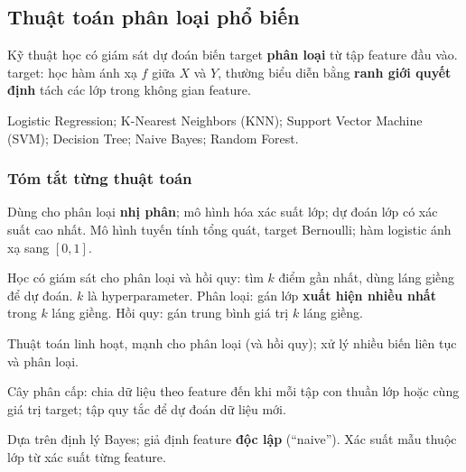 \subsection{Thuật toán phân loại phổ biến}

\begin{dinhnghia}[title={Thuật toán phân loại}]
Kỹ thuật học có giám sát dự đoán biến target \textbf{phân loại} từ tập feature đầu vào.
target: học hàm ánh xạ $f$ giữa $X$ và $Y$, thường biểu diễn bằng \textbf{ranh giới quyết định} tách các lớp trong không gian feature.
\end{dinhnghia}

\begin{phuongphap}[title={Danh sách (chi tiết ở các chương sau)}]
Logistic Regression; K-Nearest Neighbors (KNN); Support Vector Machine (SVM); Decision Tree; Naive Bayes; Random Forest.
\end{phuongphap}

\subsubsection{Tóm tắt từng thuật toán}

\begin{ynghia}[title={Logistic Regression}]
Dùng cho phân loại \textbf{nhị phân}; mô hình hóa xác suất lớp; dự đoán lớp có xác suất cao nhất.
Mô hình tuyến tính tổng quát, target Bernoulli; hàm logistic ánh xạ sang $[0,1]$.
\end{ynghia}

\begin{ynghia}[title={K-Nearest Neighbors (KNN)}]
Học có giám sát cho phân loại và hồi quy: tìm $k$ điểm gần nhất, dùng láng giềng để dự đoán.
$k$ là hyperparameter.
Phân loại: gán lớp \textbf{xuất hiện nhiều nhất} trong $k$ láng giềng.
Hồi quy: gán trung bình giá trị $k$ láng giềng.
\end{ynghia}

\begin{ynghia}[title={Support Vector Machine (SVM)}]
Thuật toán linh hoạt, mạnh cho phân loại (và hồi quy); xử lý nhiều biến liên tục và phân loại.
\end{ynghia}

\begin{ynghia}[title={Decision Tree}]
Cây phân cấp: chia dữ liệu theo feature đến khi mỗi tập con thuần lớp hoặc cùng giá trị target; tập quy tắc để dự đoán dữ liệu mới.
\end{ynghia}

\begin{ynghia}[title={Naive Bayes}]
Dựa trên định lý Bayes; giả định feature \textbf{độc lập} (``naive'').
Xác suất mẫu thuộc lớp từ xác suất từng feature.
\end{ynghia}

